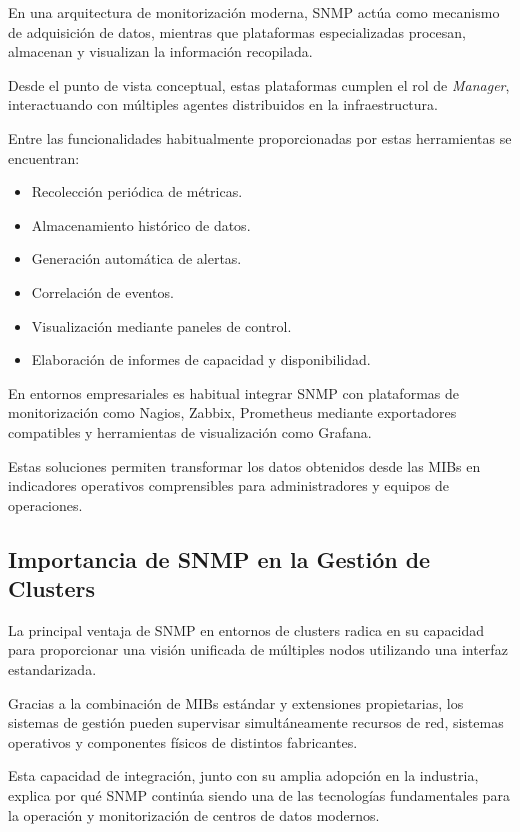 En una arquitectura de monitorización moderna, SNMP actúa como mecanismo de adquisición de datos, mientras que plataformas especializadas procesan, almacenan y visualizan la información recopilada.

Desde el punto de vista conceptual, estas plataformas cumplen el rol de \textit{Manager}, interactuando con múltiples agentes distribuidos en la infraestructura.

Entre las funcionalidades habitualmente proporcionadas por estas herramientas se encuentran:

\begin{itemize}
\item Recolección periódica de métricas.
\item Almacenamiento histórico de datos.
\item Generación automática de alertas.
\item Correlación de eventos.
\item Visualización mediante paneles de control.
\item Elaboración de informes de capacidad y disponibilidad.
\end{itemize}

En entornos empresariales es habitual integrar SNMP con plataformas de monitorización como Nagios, Zabbix, Prometheus mediante exportadores compatibles y herramientas de visualización como Grafana.

Estas soluciones permiten transformar los datos obtenidos desde las MIBs en indicadores operativos comprensibles para administradores y equipos de operaciones.

\subsection{Importancia de SNMP en la Gestión de Clusters}

La principal ventaja de SNMP en entornos de clusters radica en su capacidad para proporcionar una visión unificada de múltiples nodos utilizando una interfaz estandarizada.

Gracias a la combinación de MIBs estándar y extensiones propietarias, los sistemas de gestión pueden supervisar simultáneamente recursos de red, sistemas operativos y componentes físicos de distintos fabricantes.

Esta capacidad de integración, junto con su amplia adopción en la industria, explica por qué SNMP continúa siendo una de las tecnologías fundamentales para la operación y monitorización de centros de datos modernos.